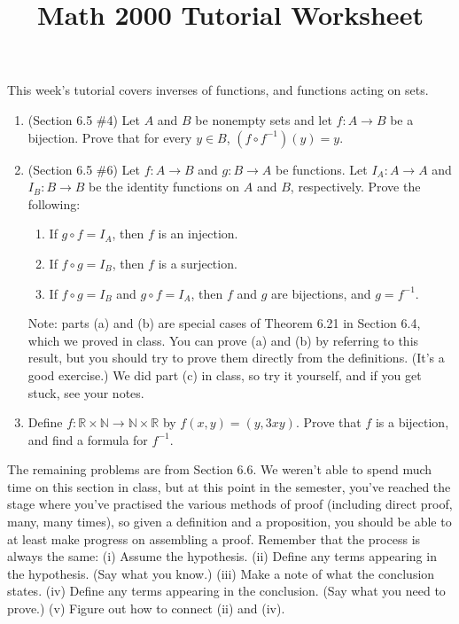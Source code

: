 \documentclass[letterpaper,12pt]{article}
\title{Math 2000 Tutorial Worksheet}
\begin{document}
\maketitle

 This week's tutorial covers inverses of functions, and functions acting on sets.
\begin{enumerate}
 \item (Section 6.5 \#4) Let $A$ and $B$ be nonempty sets and let $f:A\to B$ be a bijection. Prove that for every $y\in B$, $(f\circ f^{-1})(y) = y$.
 \item (Section 6.5 \#6) Let $f:A\to B$ and $g:B\to A$ be functions. Let $I_A:A\to A$ and $I_B:B\to B$ be the identity functions on $A$ and $B$, respectively. Prove the following:
\begin{enumerate}
 \item If $g\circ f = I_A$, then $f$ is an injection.
 \item If $f\circ g = I_B$, then $f$ is a surjection.
 \item If $f\circ g = I_B$ and $g\circ f = I_A$, then $f$ and $g$ are bijections, and $g=f^{-1}$.
\end{enumerate}
Note: parts (a) and (b) are special cases of Theorem 6.21 in Section 6.4, which we proved in class. You can prove (a) and (b) by referring to this result, but you should try to prove them directly from the definitions. (It's a good exercise.) We did part (c) in class, so try it yourself, and if you get stuck, see your notes.

 \item Define $f:\mathbb{R}\times\mathbb{N}\to\mathbb{N}\times\mathbb{R}$ by $f(x,y) = (y,3xy)$. Prove that $f$ is a bijection, and find a formula for $f^{-1}$.
\end{enumerate}

\vspace{24pt}

The remaining problems are from Section 6.6. We weren't able to spend much time on this section in class, but at this point in the semester, you've reached the stage where you've practised the various methods of proof (including direct proof, many, many times), so given a definition and a proposition, you should be able to at least make progress on assembling a proof. Remember that the process is always the same: (i) Assume the hypothesis. (ii) Define any terms appearing in the hypothesis. (Say what you know.) (iii) Make a note of what the conclusion states. (iv) Define any terms appearing in the conclusion. (Say what you need to prove.) (v) Figure out how to connect (ii) and (iv).
\end{document}
